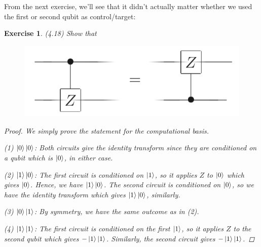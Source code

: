 \documentclass[11pt]{article}
\newcommand\0{\mathbf{0}}
\newcommand\<{\langle}
\renewcommand\>{\rangle}
\newtheorem{exercise}[theorem]{Exercise}
\begin{document}
From the next exercise, we'll see that it didn't actually matter whether we used the first or second qubit as control/target:

\begin{exercise}(4.18) Show that
	
\begin{figure}[H]
\centering
\includegraphics[width=.4\linewidth]{4_18.png}
\end{figure}

\begin{proof}
We simply prove the statement for the computational basis. 

(1) $\ket{0}\ket{0}$: Both circuits give the identity transform since they are conditioned on a qubit which is $\ket{0}$, in either case.

(2) $\ket{1}\ket{0}$: The first circuit is conditioned on $\ket{1}$, so it applies $Z$ to $\ket{0}$ which gives $\ket{0}$. Hence, we have $\ket{1}\ket{0}$. The second circuit is conditioned on $\ket{0}$, so we have the identity transform which gives $\ket{1}\ket{0}$, similarly.

(3) $\ket{0}\ket{1}$: By symmetry, we have the same outcome as in (2). 

(4) $\ket{1}\ket{1}$: The first circuit is conditioned on the first $\ket{1}$, so it applies $Z$ to the second qubit which gives $-\ket{1}\ket{1}$. Similarly, the second circuit gives $-\ket{1}\ket{1}$.
\end{proof}
\end{exercise}
\end{document}
